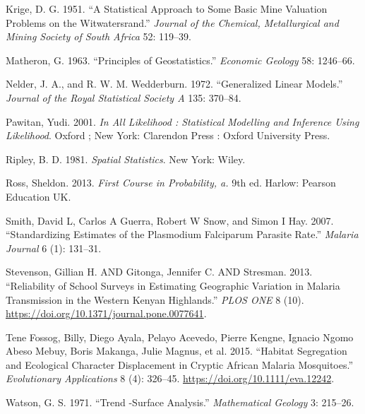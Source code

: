 \documentclass[
  letterpaper,
]{krantz}
\newlength{\cslhangindent}
\newlength{\cslentryspacingunit} %
\newenvironment{CSLReferences}[2] %
 {%
  \setlength{\parindent}{0pt}
  \ifodd #1
  \let\oldpar\par
  \def\par{\hangindent=\cslhangindent\oldpar}
  \fi
  \setlength{\parskip}{#2\cslentryspacingunit}
 }%
 {}
\begin{document}
\begin{CSLReferences}{1}{0}
\leavevmode{}%
Krige, D. G. 1951. {``A Statistical Approach to Some Basic Mine
Valuation Problems on the Witwatersrand.''} \emph{Journal of the
Chemical, Metallurgical and Mining Society of South Africa} 52: 119--39.

\leavevmode{}%
Matheron, G. 1963. {``Principles of Geostatistics.''} \emph{Economic
Geology} 58: 1246--66.

\leavevmode{}%
Nelder, J. A., and R. W. M. Wedderburn. 1972. {``Generalized Linear
Models.''} \emph{Journal of the Royal Statistical Society A} 135:
370--84.

\leavevmode{}%
Pawitan, Yudi. 2001. \emph{In All Likelihood : Statistical Modelling and
Inference Using Likelihood}. Oxford ; New York: Clarendon Press : Oxford
University Press.

\leavevmode{}%
Ripley, B. D. 1981. \emph{Spatial Statistics}. New York: Wiley.

\leavevmode{}%
Ross, Sheldon. 2013. \emph{First Course in Probability, a.} 9th ed.
Harlow: Pearson Education UK.

\leavevmode{}%
Smith, David L, Carlos A Guerra, Robert W Snow, and Simon I Hay. 2007.
{``Standardizing Estimates of the Plasmodium Falciparum Parasite
Rate.''} \emph{Malaria Journal} 6 (1): 131--31.

\leavevmode{}%
Stevenson, Gillian H. AND Gitonga, Jennifer C. AND Stresman. 2013.
{``Reliability of School Surveys in Estimating Geographic Variation in
Malaria Transmission in the Western Kenyan Highlands.''} \emph{PLOS ONE}
8 (10). \url{https://doi.org/10.1371/journal.pone.0077641}.

\leavevmode{}%
Tene Fossog, Billy, Diego Ayala, Pelayo Acevedo, Pierre Kengne, Ignacio
Ngomo Abeso Mebuy, Boris Makanga, Julie Magnus, et al. 2015. {``Habitat
Segregation and Ecological Character Displacement in Cryptic African
Malaria Mosquitoes.''} \emph{Evolutionary Applications} 8 (4): 326--45.
\url{https://doi.org/10.1111/eva.12242}.

\leavevmode{}%
Watson, G. S. 1971. {``Trend -Surface Analysis.''} \emph{Mathematical
Geology} 3: 215--26.


\end{CSLReferences}
\end{document}
